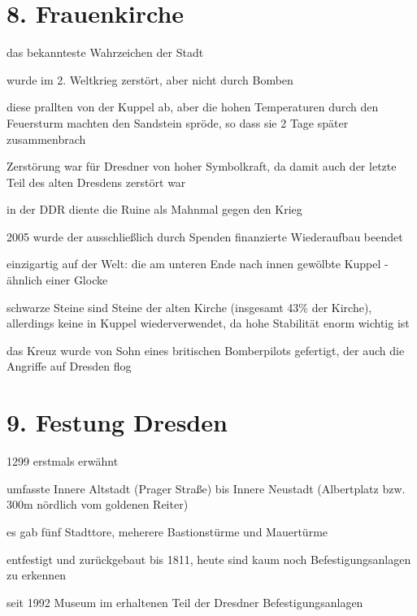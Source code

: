 \documentclass[a4paper,12pt]{report}
\begin{document}
\section{8. Frauenkirche}
\begin{itemize*}
\item das bekannteste Wahrzeichen der Stadt
\item wurde im 2. Weltkrieg zerstört, aber nicht durch Bomben
    \begin{itemize*}
    \item diese prallten von der Kuppel ab, aber die hohen Temperaturen durch den Feuersturm machten den Sandstein spröde, so dass sie 2 Tage später zusammenbrach
    \item Zerstörung war für Dresdner von hoher Symbolkraft, da damit auch der letzte Teil des alten Dresdens zerstört war
    \end{itemize*}
\item in der DDR diente die Ruine als Mahnmal gegen den Krieg
\item 2005 wurde der ausschließlich durch Spenden finanzierte Wiederaufbau beendet
\item einzigartig auf der Welt: die am unteren Ende nach innen gewölbte Kuppel - ähnlich einer Glocke
\item schwarze Steine sind Steine der alten Kirche (insgesamt 43\% der Kirche), allerdings keine in Kuppel wiederverwendet, da hohe Stabilität enorm wichtig ist
\item das Kreuz wurde von Sohn eines britischen Bomberpilots gefertigt, der auch die Angriffe auf Dresden flog
\end{itemize*}

\section{9. Festung Dresden}
\begin{itemize*}
\item 1299 erstmals erwähnt
\item umfasste Innere Altstadt (Prager Straße) bis Innere Neustadt (Albertplatz bzw. 300m nördlich vom goldenen Reiter)
\item es gab fünf Stadttore, meherere Bastionstürme und Mauertürme
\item entfestigt und zurückgebaut bis 1811, heute sind kaum noch Befestigungsanlagen zu erkennen
\item seit 1992 Museum im erhaltenen Teil der Dresdner Befestigungsanlagen
\end{itemize*}
\end{document}
